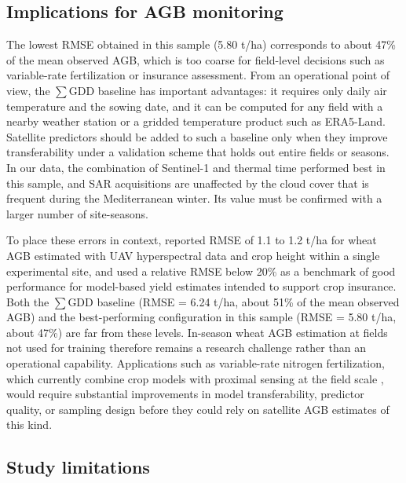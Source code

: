 \documentclass[
  english,
  review,
  number,
  sort,compress,
  authoryear,
  3p]{elsarticle}
\begin{document}
\subsection{Implications for AGB
monitoring}\label{implications-for-agb-monitoring}

The lowest RMSE obtained in this sample (5.80 t/ha) corresponds to about
47\% of the mean observed AGB, which is too coarse for field-level
decisions such as variable-rate fertilization or insurance assessment.
From an operational point of view, the \(\sum\)GDD baseline has
important advantages: it requires only daily air temperature and the
sowing date, and it can be computed for any field with a nearby weather
station or a gridded temperature product such as ERA5-Land. Satellite
predictors should be added to such a baseline only when they improve
transferability under a validation scheme that holds out entire fields
or seasons. In our data, the combination of Sentinel-1 and thermal time
performed best in this sample, and SAR acquisitions are unaffected by
the cloud cover that is frequent during the Mediterranean winter. Its
value must be confirmed with a larger number of site-seasons.

To place these errors in context, \citet{yue_estimation_2017} reported
RMSE of 1.1 to 1.2 t/ha for wheat AGB estimated with UAV hyperspectral
data and crop height within a single experimental site, and
\citet{arumugam_near_2020} used a relative RMSE below 20\% as a
benchmark of good performance for model-based yield estimates intended
to support crop insurance. Both the \(\sum\)GDD baseline (RMSE = 6.24
t/ha, about 51\% of the mean observed AGB) and the best-performing
configuration in this sample (RMSE = 5.80 t/ha, about 47\%) are far from
these levels. In-season wheat AGB estimation at fields not used for
training therefore remains a research challenge rather than an
operational capability. Applications such as variable-rate nitrogen
fertilization, which currently combine crop models with proximal sensing
at the field scale \citep{gobbo_evaluation_2022}, would require
substantial improvements in model transferability, predictor quality, or
sampling design before they could rely on satellite AGB estimates of
this kind.

\subsection{Study limitations}\label{study-limitations}
\end{document}
